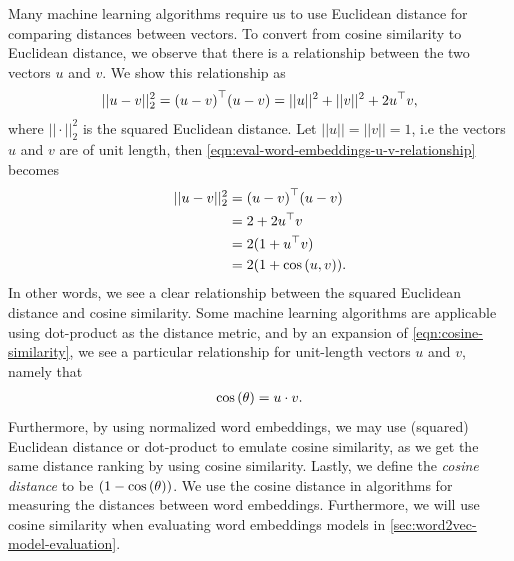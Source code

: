 Many machine learning algorithms require us to use Euclidean distance for comparing distances between vectors. To convert from cosine similarity to Euclidean distance, we observe that there is a relationship between the two vectors $u$ and $v$. We show this relationship as
\begin{align}
    ||u - v||_2^2 = {(u - v)}^\top (u - v) = ||u||^2 + ||v||^2 + 2{u}^\top v,
    \label{eqn:eval-word-embeddings-u-v-relationship}
\end{align}
where $||\cdot||_2^2$ is the squared Euclidean distance. Let $||u|| = ||v|| = 1$, i.e the vectors $u$ and $v$ are of unit length, then \cref{eqn:eval-word-embeddings-u-v-relationship} becomes
\begin{align}
    ||u - v||_2^2
    &= {(u - v)}^\top (u - v) \\
    &= 2 + 2{u}^\top v \notag \\
    &= 2(1 + {u}^\top v) \notag \\
    &= 2(1 + \cos \left(u, v\right)). \notag
\end{align}
In other words, we see a clear relationship between the squared Euclidean distance and cosine similarity. Some machine learning algorithms are applicable using dot-product as the distance metric, and by an expansion of \cref{eqn:cosine-similarity}, we see a particular relationship for unit-length vectors $u$ and $v$, namely that
\begin{align}
    \cos\left(\theta\right) = u \cdot v.
\end{align}
Furthermore, by using normalized word embeddings, we may use (squared) Euclidean distance or dot-product to emulate cosine similarity, as we get the same distance ranking by using cosine similarity. Lastly, we define the \textit{cosine distance} to be $(1 - \cos\left(\theta\right))$. We use the cosine distance in algorithms for measuring the distances between word embeddings. Furthermore, we will use cosine similarity when evaluating word embeddings models in \cref{sec:word2vec-model-evaluation}.